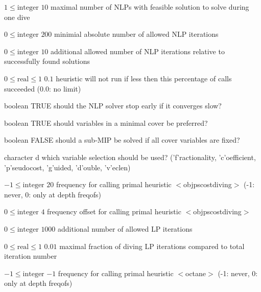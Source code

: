 %
{$1\leq\textrm{integer}$}%
{$10$}%
{maximal number of NLPs with feasible solution to solve during one dive}%
{}

%
{$0\leq\textrm{integer}$}%
{$200$}%
{minimial absolute number of allowed NLP iterations}%
{}

%
{$0\leq\textrm{integer}$}%
{$10$}%
{additional allowed number of NLP iterations relative to successfully found solutions}%
{}

%
{$0\leq\textrm{real}\leq1$}%
{$0.1$}%
{heuristic will not run if less then this percentage of calls succeeded (0.0: no limit)}%
{}

%
{boolean}%
{TRUE}%
{should the NLP solver stop early if it converges slow?}%
{}

%
{boolean}%
{TRUE}%
{should variables in a minimal cover be preferred?}%
{}

%
{boolean}%
{FALSE}%
{should a sub-MIP be solved if all cover variables are fixed?}%
{}

%
{character}%
{d}%
{which variable selection should be used? ('f'ractionality, 'c'oefficient, 'p'seudocost, 'g'uided, 'd'ouble, 'v'eclen)}%
{}

%
{$-1\leq\textrm{integer}$}%
{$20$}%
{frequency for calling primal heuristic $<$objpscostdiving$>$ (-1: never, 0: only at depth freqofs)}%
{}

%
{$0\leq\textrm{integer}$}%
{$4$}%
{frequency offset for calling primal heuristic $<$objpscostdiving$>$}%
{}

%
{$0\leq\textrm{integer}$}%
{$1000$}%
{additional number of allowed LP iterations}%
{}

%
{$0\leq\textrm{real}\leq1$}%
{$0.01$}%
{maximal fraction of diving LP iterations compared to total iteration number}%
{}

%
{$-1\leq\textrm{integer}$}%
{$-1$}%
{frequency for calling primal heuristic $<$octane$>$ (-1: never, 0: only at depth freqofs)}%
{}

